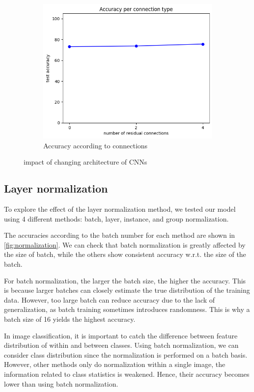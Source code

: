 \begin{figure}[htbp]
    \hfill
	\begin{subfigure}[t]{0.3\linewidth}
		\centering
		\includegraphics[width=\linewidth]{image/q4-2-connection.png}
		\caption{Accuracy according to connections}
		\label{fig:q4-2-connection}
	\end{subfigure}

	\caption{impact of changing architecture of CNNs}
	\label{fig:cnn_architecture}
\end{figure}

\subsection{Layer normalization}
To explore the effect of the layer normalization method, we tested our model using 4 different methods: batch, layer, instance, and group normalization.

The accuracies according to the batch number for each method are shown in \cref{fig:normalization}. We can check that batch normalization is greatly affected by the size of batch, while the others show consistent accuracy w.r.t. the size of the batch.

For batch normalization, the larger the batch size, the higher the accuracy. This is because larger batches can closely estimate the true distribution of the training data. However, too large batch can reduce accuracy due to the lack of generalization, as batch training sometimes introduces randomness. This is why a batch size of 16 yields the highest accuracy.

In image classification, it is important to catch the difference between feature distribution of within and between classes. Using batch normalization, we can consider class distribution since the normalization is performed on a batch basis. However, other methods only do normalization within a single image, the information related to class statistics is weakened. Hence, their accuracy becomes lower than using batch normalization.

